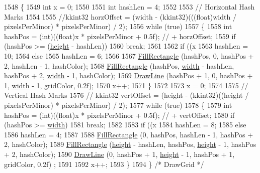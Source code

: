 \begin{DoxyCode}
1548 \{
1549   \textcolor{keywordtype}{int}  x = 0;
1550 
1551   \textcolor{keywordtype}{int}  hashLen = 4;
1552 
1553   \textcolor{comment}{// Horizontal Hash Marks}
1554 
1555   \textcolor{comment}{//kkint32  horzOffset = (width - (kkint32)(((float)width / pixelsPerMinor) * pixelsPerMinor) / 2);}
1556   \textcolor{keywordflow}{while}  (\textcolor{keyword}{true})
1557   \{
1558     \textcolor{keywordtype}{int}  hashPos = (int)((\textcolor{keywordtype}{float})x * pixelsPerMinor + 0.5f); \textcolor{comment}{// + horzOffset;}
1559     \textcolor{keywordflow}{if}  (hashPos >= (\hyperlink{class_k_k_b_1_1_raster_af39ff189de4fbb6de98392e187efafb7}{height} - hashLen))
1560       \textcolor{keywordflow}{break};
1561 
1562     \textcolor{keywordflow}{if}  ((x %
1563       hashLen = 10;
1564     \textcolor{keywordflow}{else}
1565       hashLen = 6;
1566 
1567     \hyperlink{class_k_k_b_1_1_raster_a01417ee32f63004e7ae6e385e6f0f66e}{FillRectangle} (hashPos,     0,               hashPos + 2, hashLen - 1, hashColor);
1568     \hyperlink{class_k_k_b_1_1_raster_a01417ee32f63004e7ae6e385e6f0f66e}{FillRectangle} (hashPos,     \hyperlink{class_k_k_b_1_1_raster_ae0bcc103e191c3421d7692dc69ceb554}{width} - hashLen, hashPos + 2, 
      \hyperlink{class_k_k_b_1_1_raster_ae0bcc103e191c3421d7692dc69ceb554}{width} - 1,   hashColor);
1569     \hyperlink{class_k_k_b_1_1_raster_a118bf0fa32356ddea42f579c044c65cd}{DrawLine}      (hashPos + 1, 0,               hashPos + 1, \hyperlink{class_k_k_b_1_1_raster_ae0bcc103e191c3421d7692dc69ceb554}{width} - 1,   gridColor, 0.2f);
1570     x++;
1571   \}
1572 
1573   x = 0;
1574 
1575   \textcolor{comment}{// Vertical Hash Marks}
1576   \textcolor{comment}{// kkint32  vertOffset = (height - (kkint32)((height / pixelsPerMinor) * pixelsPerMinor) / 2);}
1577   \textcolor{keywordflow}{while}  (\textcolor{keyword}{true})
1578   \{
1579     \textcolor{keywordtype}{int}  hashPos = (int)((\textcolor{keywordtype}{float})x * pixelsPerMinor + 0.5f); \textcolor{comment}{// + vertOffset;}
1580     \textcolor{keywordflow}{if}  (hashPos >= \hyperlink{class_k_k_b_1_1_raster_ae0bcc103e191c3421d7692dc69ceb554}{width})
1581       \textcolor{keywordflow}{break};
1582 
1583     \textcolor{keywordflow}{if}  ((x %
1584       hashLen = 8;
1585     \textcolor{keywordflow}{else}
1586       hashLen = 4;
1587 
1588     \hyperlink{class_k_k_b_1_1_raster_a01417ee32f63004e7ae6e385e6f0f66e}{FillRectangle} (0,                 hashPos,     hashLen - 1, hashPos + 2, hashColor);
1589     \hyperlink{class_k_k_b_1_1_raster_a01417ee32f63004e7ae6e385e6f0f66e}{FillRectangle} (\hyperlink{class_k_k_b_1_1_raster_af39ff189de4fbb6de98392e187efafb7}{height} - hashLen,  hashPos,     \hyperlink{class_k_k_b_1_1_raster_af39ff189de4fbb6de98392e187efafb7}{height} - 1,  hashPos + 2, 
      hashColor);
1590     \hyperlink{class_k_k_b_1_1_raster_a118bf0fa32356ddea42f579c044c65cd}{DrawLine}      (0,                 hashPos + 1, \hyperlink{class_k_k_b_1_1_raster_af39ff189de4fbb6de98392e187efafb7}{height} - 1,  hashPos + 1, gridColor, 0.2f)
      ;
1591 
1592     x++;
1593   \}
1594 \}  \textcolor{comment}{/* DrawGrid */}
\end{DoxyCode}
